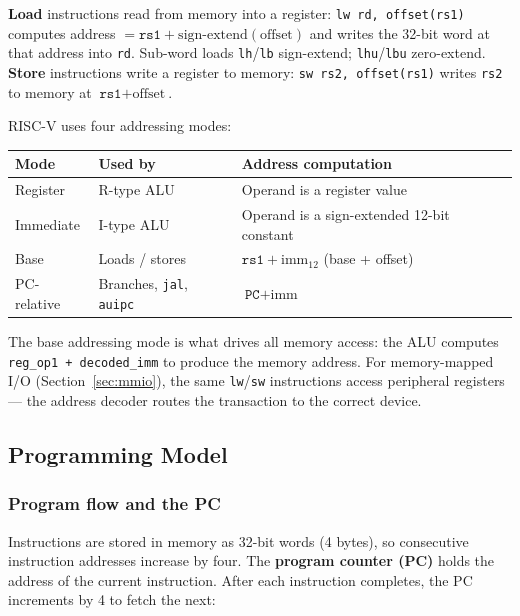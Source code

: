 \documentclass[9pt, a4paper]{extarticle}
\begin{document}
\textbf{Load} instructions read from memory into a register: \texttt{lw rd, offset(rs1)} computes address $= \texttt{rs1} + \text{sign-extend}(\text{offset})$ and writes the 32-bit word at that address into \texttt{rd}. Sub-word loads \texttt{lh}/\texttt{lb} sign-extend; \texttt{lhu}/\texttt{lbu} zero-extend. \textbf{Store} instructions write a register to memory: \texttt{sw rs2, offset(rs1)} writes \texttt{rs2} to memory at $\texttt{rs1} + \text{offset}$.

RISC-V uses four addressing modes:

\begin{center}\small
\begin{tabular}{@{}l l l@{}}
    \toprule
    Mode & Used by & Address computation \\
    \midrule
    Register & R-type ALU & Operand is a register value \\
    Immediate & I-type ALU & Operand is a sign-extended 12-bit constant \\
    Base & Loads / stores & $\texttt{rs1} + \text{imm}_{12}$ (base + offset) \\
    PC-relative & Branches, \texttt{jal}, \texttt{auipc} & $\texttt{PC} + \text{imm}$ \\
    \bottomrule
\end{tabular}
\end{center}

The base addressing mode is what drives all memory access: the ALU computes \texttt{reg\_op1 + decoded\_imm} to produce the memory address. For memory-mapped I/O (Section~\ref{sec:mmio}), the same \texttt{lw}/\texttt{sw} instructions access peripheral registers --- the address decoder routes the transaction to the correct device.

\subsection{Programming Model}

\subsubsection{Program flow and the PC}

Instructions are stored in memory as 32-bit words (4 bytes), so consecutive instruction addresses increase by four. The \textbf{program counter (PC)} holds the address of the current instruction. After each instruction completes, the PC increments by 4 to fetch the next:
\end{document}
